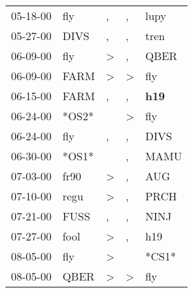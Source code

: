 \begin{supertabular}{p{0.07\textwidth}p{0.06\textwidth}p{0.02\textwidth}p{0.02\textwidth}p{0.06\textwidth}}
          05-18-00\textsuperscript{} &            fly\textsuperscript{} &                , &                , &           lupy\textsuperscript{} \\
          05-27-00\textsuperscript{} &           DIVS\textsuperscript{} &                , &                , &           tren\textsuperscript{} \\
          06-09-00\textsuperscript{} &            fly\textsuperscript{} &     \textgreater &                , &           QBER\textsuperscript{} \\
          06-09-00\textsuperscript{} &           FARM\textsuperscript{} &     \textgreater &     \textgreater &            fly\textsuperscript{} \\
          06-15-00\textsuperscript{} &           FARM\textsuperscript{} &                , &                , &   \textbf{h19\textsuperscript{}} \\
          06-24-00\textsuperscript{} &                            *OS2* &                  &     \textgreater &            fly\textsuperscript{} \\
          06-24-00\textsuperscript{} &            fly\textsuperscript{} &                , &                , &           DIVS\textsuperscript{} \\
          06-30-00\textsuperscript{} &                            *OS1* &                  &                , &           MAMU\textsuperscript{} \\
          07-03-00\textsuperscript{} &           fr90\textsuperscript{} &     \textgreater &                , &            AUG\textsuperscript{} \\
          07-10-00\textsuperscript{} &           regu\textsuperscript{} &     \textgreater &                , &           PRCH\textsuperscript{} \\
          07-21-00\textsuperscript{} &           FUSS\textsuperscript{} &                , &                , &           NINJ\textsuperscript{} \\
          07-27-00\textsuperscript{} &           fool\textsuperscript{} &     \textgreater &                , &            h19\textsuperscript{} \\
          08-05-00\textsuperscript{} &            fly\textsuperscript{} &     \textgreater &                  &                            *CS1* \\
          08-05-00\textsuperscript{} &           QBER\textsuperscript{} &     \textgreater &     \textgreater &            fly\textsuperscript{} \\

\end{supertabular}
